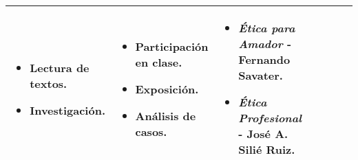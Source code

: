 \begin{landscape}
\begin{adjustbox}{width=1.3847\textwidth}
\begin{tabular}{ | p{3cm} | p{5cm} | p{5cm} | p{3cm} | p{3cm} | p{3cm} | p{5cm} | }
\begin{minipage}
                \begin{itemize}[leftmargin=10pt]
                    \item Lectura de textos.
                    \item Investigación.
                \end{itemize}
                \end{minipage} & \begin{minipage}
                    [t]{3cm}
                \begin{itemize}[leftmargin=10pt]
                    \item Participación en clase.
                    \item Exposición.
                    \item Análisis de casos.
                \end{itemize}
                \end{minipage} & \begin{minipage}
                    [t]{5cm}
                \begin{itemize}[leftmargin=10pt]
                    \item \textit{Ética para Amador} - Fernando Savater.
                    \item \textit{Ética Profesional} - José A. Silié Ruiz.
                \end{itemize}
                \end{minipage} \\
            \hline
        \end{tabular}
    \end{adjustbox}
\end{landscape}